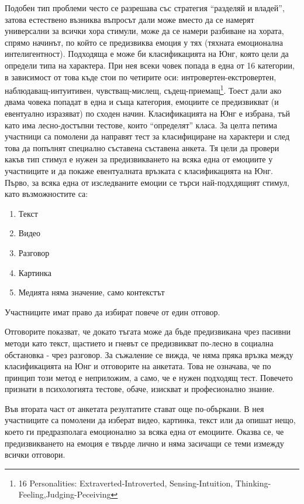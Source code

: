 \documentclass[main.tex]{subfiles}
\begin{document}
Подобен тип проблеми често се разрешава със стратегия ``разделяй и владей'', затова естествено възниква въпросът дали може вместо да се намерят универсални за всички хора стимули, може да се намери разбиване на хората, спрямо начинът, по който се предизвиква емоция у тях (тяхната емоционална интелигентност). Подходяща е може би класификацията на Юнг, която цели да определи типа на характера. При нея всеки човек попада в една от 16 категории, в зависимост от това къде стои по четирите оси: интровертен-екстровертен, наблюдаващ-интуитивен,  чувстващ-мислещ, съдещ-приемащ\footnote{16 Personalities: Extraverted-Introverted, Sensing-Intuition, Thinking-Feeling,Judging-Peceiving}. Тоест дали ако двама човека попадат в една и съща категория, емоциите се предизвикват (и евентуално изразяват) по сходен начин. Класификацията на Юнг е избрана, тъй като има лесно-достъпни тестове, които ``определят'' класа. 
За целта петима участници са помолени да направят тест за класифициране на характери и след това да попълнят специално съставена съставена анкета. Тя цели да провери какъв тип стимул е нужен за предизвикването на всяка една от емоциите у участниците и да покаже евентуалната връзката с класификацията на Юнг.
Първо, за всяка една от изследваните емоции се търси най-подхдящият стимул, като възможностите са:
\begin{enumerate}
    \item Текст
    \item Видео
    \item Разговор
    \item Картинка
    \item Медията няма значение, само контекстът
\end{enumerate}
Участниците имат право да избират повече от един отговор.

Отговорите показват, че докато тъгата може да бъде предизвикана чрез пасивни методи като текст, щастието и гневът се предизвикват по-лесно в социална обстановка - чрез разговор. За съжаление се вижда, че няма пряка връзка между класификацията на Юнг и отговорите на анкетата. Това не означава, че по принцип този метод е неприложим, а само, че е нужен подходящ тест. Повечето признати в психологията тестове, обаче, изискват и професионално знание. 

Във втората част от анкетата резултатите стават още по-объркани. В нея участниците са помолени да изберат видео, картинка, текст или да опишат нещо, което ги предразполага емоционално за всяка една от емоциите. Оказва се, че предизвикването на емоция е твърде лично и няма засичащи се теми измежду всички отговори.
\end{document}
